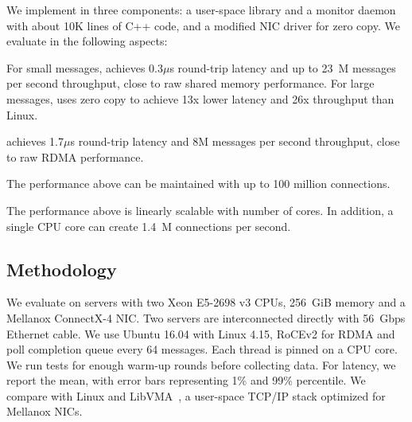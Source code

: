 

We implement \sys in three components: a user-space library \libipc{} and a monitor daemon with about 10K lines of C++ code, and a modified NIC driver for zero copy.
We evaluate \sys in the following aspects:

For small messages, \sys achieves 0.3$\mu$s round-trip latency and up to 23~M messages per second throughput, close to raw shared memory performance. For large messages, \sys uses zero copy to achieve 13x lower latency and 26x throughput than Linux.

\sys achieves  1.7$\mu$s round-trip latency and 8M messages per second throughput, close to raw RDMA performance.

The performance above can be maintained with up to 100 million connections.

The performance above is linearly scalable with number of cores. In addition, a single CPU core can create 1.4~M connections per second.





\subsection{Methodology}
\label{subsec:methodology}

We evaluate \sys on servers with two Xeon E5-2698 v3 CPUs, 256~GiB memory and a Mellanox ConnectX-4 NIC. Two servers are interconnected directly with 56~Gbps Ethernet cable. We use Ubuntu 16.04 with Linux 4.15, RoCEv2 for RDMA and poll completion queue every 64 messages.
Each thread is pinned on a CPU core. We run tests for enough warm-up rounds before collecting data. For latency, we report the mean, with error bars representing 1\% and 99\% percentile.
We compare with Linux and LibVMA~\cite{libvma}, a user-space TCP/IP stack optimized for Mellanox NICs.

